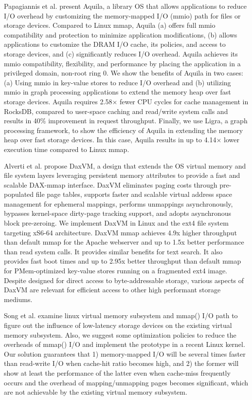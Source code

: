Papagiannis et al. \cite{papagiannis2021memory} present Aquila, a library OS that allows applications to reduce I/O overhead by customizing the memory-mapped I/O (mmio) path for files or storage devices. Compared to Linux mmap, Aquila (a) offers full mmio compatibility and protection to minimize application modifications, (b) allows applications to customize the DRAM I/O cache, its policies, and access to storage devices, and (c) significantly reduces I/O overhead. Aquila achieves its mmio compatibility, flexibility, and performance by placing the application in a privileged domain, non-root ring 0. We show the benefits of Aquila in two cases: (a) Using mmio in key-value stores to reduce I/O overhead and (b) utilizing mmio in graph processing applications to extend the memory heap over fast storage devices. Aquila requires 2.58× fewer CPU cycles for cache management in RocksDB, compared to user-space caching and read/write system calls and results in 40\% improvement in request throughput. Finally, we use Ligra, a graph processing framework, to show the efficiency of Aquila in extending the memory heap over fast storage devices. In this case, Aquila results in up to 4.14× lower execution time compared to Linux mmap.

Alverti et al. \cite{alverti2022daxvm} propose DaxVM, a design that extends the OS virtual memory and file system layers leveraging persistent memory attributes to provide a fast and scalable DAX-mmap interface. DaxVM eliminates paging costs through pre-populated file page tables, supports faster and scalable virtual address space management for ephemeral mappings, performs unmappings asynchronously, bypasses kernel-space dirty-page tracking support, and adopts asynchronous block pre-zeroing. We implement DaxVM in Linux and the ext4 file system targeting xS6-64 architecture. DaxVM mmap achieves 4.9x higher throughput than default mmap for the Apache webserver and up to 1.5x better performance than read system calls. It provides similar benefits for text search. It also provides fast boot times and up to 2.95x better throughput than default mmap for PMem-optimized key-value stores running on a fragmented ext4 image. Despite designed for direct access to byte-addressable storage, various aspects of DaxVM are relevant for efficient access to other high performant storage mediums.

Song et al. \cite{song2012low} examine linux virtual memory subsystem and mmap() I/O path to figure out the influence of low-latency storage devices on the existing virtual memory subsystem. Also, we suggest some optimization policies to reduce the overheads of mmap() I/O and implement the prototype in a recent Linux kernel. Our solution guarantees that 1) memory-mapped I/O will be several times faster than read-write I/O when cache-hit ratio becomes high, and 2) the former will show at least the performance of the latter even when cache-miss frequently occurs and the overhead of mapping/unmapping pages becomes significant, which are not achievable by the existing virtual memory subsystem.


